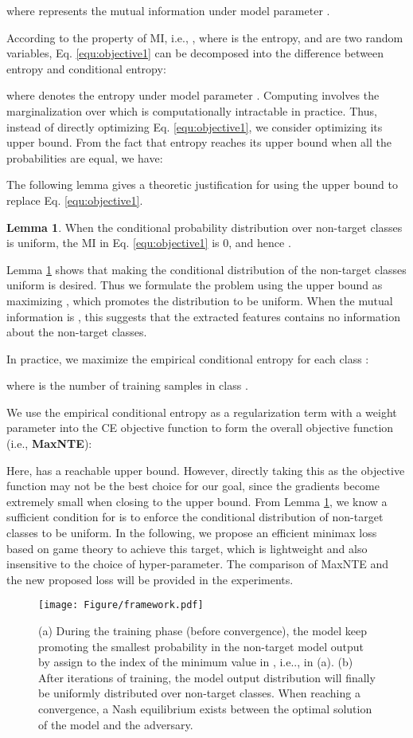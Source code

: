 \documentclass{article}
\theoremstyle{definition}
\newtheorem{lemma}{Lemma}
\begin{document}
where  represents the mutual information under model parameter .

According to the property of MI, i.e., , where  is the entropy, and  are two random variables, Eq. \ref{equ:objective1} can be decomposed into the difference between entropy and conditional entropy:

where  denotes the entropy under model parameter . Computing  involves the marginalization over  which is computationally intractable in practice. Thus, instead of directly optimizing Eq. \ref{equ:objective1}, we consider optimizing its upper bound. From the fact that entropy reaches its upper bound when all the probabilities are equal, we have:



The following lemma gives a theoretic justification for using the upper bound to replace Eq. \ref{equ:objective1}.
\begin{lemma}\label{lemma1}
    When the conditional probability distribution over non-target classes is uniform, the MI in Eq. \ref{equ:objective1} is 0, and hence .
\end{lemma}

Lemma \ref{lemma1} shows that making the conditional distribution of the non-target classes uniform is desired. Thus we formulate the problem using the upper bound as maximizing , which promotes the distribution to be uniform. When the mutual information is , this suggests that the extracted features contains no information about the non-target classes.

In practice, we maximize the empirical conditional entropy for each class :

where  is the number of training samples in class .

We use the empirical conditional entropy as a regularization term with a weight parameter  into the CE objective function to form the overall objective function (i.e., \textbf{MaxNTE}):


Here,  has a reachable upper bound. However, directly taking this as the objective function may not be the best choice for our goal, since the gradients become extremely small when closing to the upper bound. From Lemma \ref{lemma1}, we know a sufficient condition for  is to enforce the conditional distribution of non-target classes to be uniform. In the following, we propose an efficient minimax loss based on game theory to achieve this target, which is lightweight and also insensitive to the choice of hyper-parameter. The comparison of MaxNTE and the new proposed loss will be provided in the experiments.
\begin{figure*}[t]
    \centering\centerline{\texttt{[image: Figure/framework.pdf]}}
    \caption{(a) During the training phase (before convergence), the model keep promoting the smallest probability in the non-target model output by assign  to the index of the minimum value in , i.e..,  in (a). (b) After iterations of training, the model output distribution will finally be uniformly distributed over non-target classes. When reaching a convergence, a Nash equilibrium exists between the optimal solution of the model and the adversary.}
    \label{fig:overview}
\end{figure*}
\end{document}
